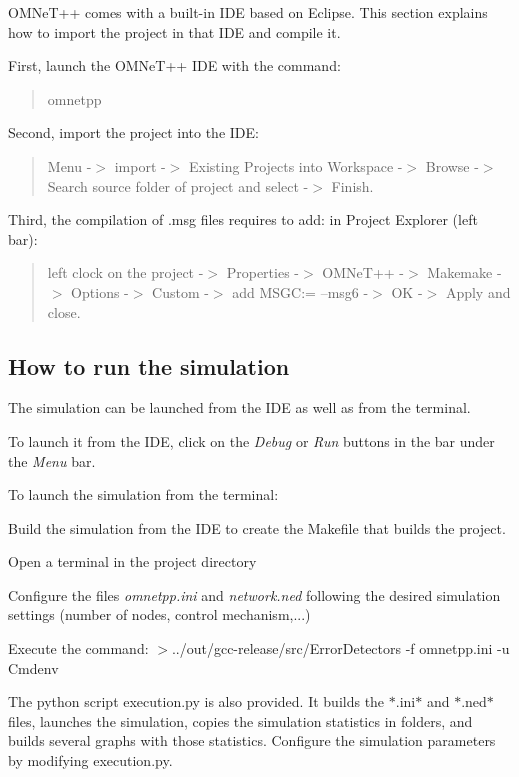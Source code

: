O\+M\+Ne\+T++ comes with a built-\/in I\+DE based on Eclipse. This section explains how to import the project in that I\+DE and compile it.

First, launch the O\+M\+Ne\+T++ I\+DE with the command\+: \begin{quote}
omnetpp \end{quote}


Second, import the project into the I\+DE\+: \begin{quote}
Menu -\/$>$ import -\/$>$ Existing Projects into Workspace -\/$>$ Browse -\/$>$ Search source folder of project and select -\/$>$ Finish. \end{quote}


Third, the compilation of .msg files requires to add\+: in Project Explorer (left bar)\+: \begin{quote}
left clock on the project -\/$>$ Properties -\/$>$ O\+M\+Ne\+T++ -\/$>$ Makemake -\/$>$ Options -\/$>$ Custom -\/$>$ add M\+S\+GC\+:= --msg6 -\/$>$ OK -\/$>$ Apply and close. \end{quote}


\subsection*{How to run the simulation}

The simulation can be launched from the I\+DE as well as from the terminal.

To launch it from the I\+DE, click on the {\itshape Debug} or {\itshape Run} buttons in the bar under the {\itshape Menu} bar.

To launch the simulation from the terminal\+:
\begin{DoxyEnumerate}
\item Build the simulation from the I\+DE to create the Makefile that builds the project.
\item Open a terminal in the project directory
\item Configure the files {\itshape omnetpp.\+ini} and {\itshape network.\+ned} following the desired simulation settings (number of nodes, control mechanism,...)
\item Execute the command\+: $>$../out/gcc-\/release/src/\+Error\+Detectors -\/f omnetpp.\+ini -\/u Cmdenv
\end{DoxyEnumerate}

The python script \textquotesingle{}execution.\+py\textquotesingle{} is also provided. It builds the $\ast$.ini$\ast$ and $\ast$.ned$\ast$ files, launches the simulation, copies the simulation statistics in folders, and builds several graphs with those statistics. Configure the simulation parameters by modifying \textquotesingle{}execution.\+py\textquotesingle{}.

